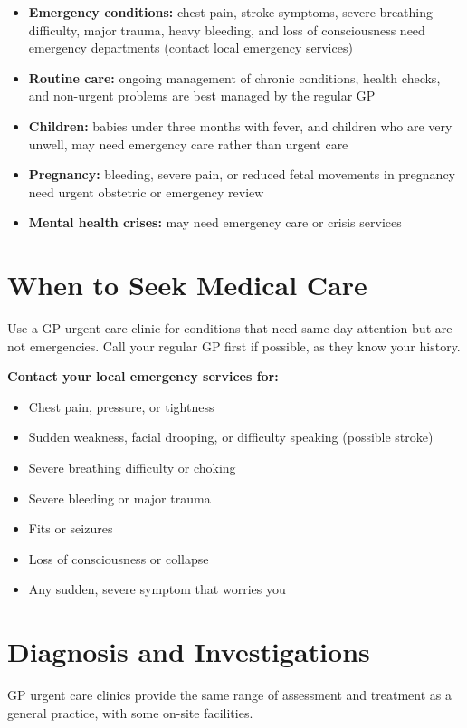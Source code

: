 \begin{itemize}
    \item \textbf{Emergency conditions:} chest pain, stroke symptoms, severe breathing difficulty, major trauma, heavy bleeding, and loss of consciousness need emergency departments (contact local emergency services)
    \item \textbf{Routine care:} ongoing management of chronic conditions, health checks, and non-urgent problems are best managed by the regular GP
    \item \textbf{Children:} babies under three months with fever, and children who are very unwell, may need emergency care rather than urgent care
    \item \textbf{Pregnancy:} bleeding, severe pain, or reduced fetal movements in pregnancy need urgent obstetric or emergency review
    \item \textbf{Mental health crises:} may need emergency care or crisis services
\end{itemize}

\section*{When to Seek Medical Care}
Use a GP urgent care clinic for conditions that need same-day attention but are not emergencies. Call your regular GP first if possible, as they know your history.

\textbf{Contact your local emergency services for:}
\begin{itemize}
    \item Chest pain, pressure, or tightness
    \item Sudden weakness, facial drooping, or difficulty speaking (possible stroke)
    \item Severe breathing difficulty or choking
    \item Severe bleeding or major trauma
    \item Fits or seizures
    \item Loss of consciousness or collapse
    \item Any sudden, severe symptom that worries you
\end{itemize}

\section*{Diagnosis and Investigations}
GP urgent care clinics provide the same range of assessment and treatment as a general practice, with some on-site facilities.


